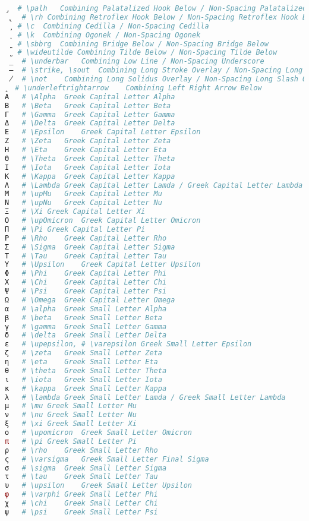 \begin{lstlisting}[language=Julia, linewidth=\textwidth]
 ̡  # \palh   Combining Palatalized Hook Below / Non-Spacing Palatalized Hook Below
 ̢  # \rh Combining Retroflex Hook Below / Non-Spacing Retroflex Hook Below
 ̧  # \c  Combining Cedilla / Non-Spacing Cedilla
 ̨  # \k  Combining Ogonek / Non-Spacing Ogonek
 ̪  # \sbbrg  Combining Bridge Below / Non-Spacing Bridge Below
 ̰  # \wideutilde Combining Tilde Below / Non-Spacing Tilde Below
 ̲  # \underbar   Combining Low Line / Non-Spacing Underscore
 ̶  # \strike, \sout  Combining Long Stroke Overlay / Non-Spacing Long Bar Overlay
 ̸  # \not    Combining Long Solidus Overlay / Non-Spacing Long Slash Overlay
 ͍  # \underleftrightarrow    Combining Left Right Arrow Below
Α   # \Alpha  Greek Capital Letter Alpha
Β   # \Beta   Greek Capital Letter Beta
Γ   # \Gamma  Greek Capital Letter Gamma
Δ   # \Delta  Greek Capital Letter Delta
Ε   # \Epsilon    Greek Capital Letter Epsilon
Ζ   # \Zeta   Greek Capital Letter Zeta
Η   # \Eta    Greek Capital Letter Eta
Θ   # \Theta  Greek Capital Letter Theta
Ι   # \Iota   Greek Capital Letter Iota
Κ   # \Kappa  Greek Capital Letter Kappa
Λ   # \Lambda Greek Capital Letter Lamda / Greek Capital Letter Lambda
Μ   # \upMu   Greek Capital Letter Mu
Ν   # \upNu   Greek Capital Letter Nu
Ξ   # \Xi Greek Capital Letter Xi
Ο   # \upOmicron  Greek Capital Letter Omicron
Π   # \Pi Greek Capital Letter Pi
Ρ   # \Rho    Greek Capital Letter Rho
Σ   # \Sigma  Greek Capital Letter Sigma
Τ   # \Tau    Greek Capital Letter Tau
Υ   # \Upsilon    Greek Capital Letter Upsilon
Φ   # \Phi    Greek Capital Letter Phi
Χ   # \Chi    Greek Capital Letter Chi
Ψ   # \Psi    Greek Capital Letter Psi
Ω   # \Omega  Greek Capital Letter Omega
α   # \alpha  Greek Small Letter Alpha
β   # \beta   Greek Small Letter Beta
γ   # \gamma  Greek Small Letter Gamma
δ   # \delta  Greek Small Letter Delta
ε   # \upepsilon, # \varepsilon Greek Small Letter Epsilon
ζ   # \zeta   Greek Small Letter Zeta
η   # \eta    Greek Small Letter Eta
θ   # \theta  Greek Small Letter Theta
ι   # \iota   Greek Small Letter Iota
κ   # \kappa  Greek Small Letter Kappa
λ   # \lambda Greek Small Letter Lamda / Greek Small Letter Lambda
μ   # \mu Greek Small Letter Mu
ν   # \nu Greek Small Letter Nu
ξ   # \xi Greek Small Letter Xi
ο   # \upomicron  Greek Small Letter Omicron
π   # \pi Greek Small Letter Pi
ρ   # \rho    Greek Small Letter Rho
ς   # \varsigma   Greek Small Letter Final Sigma
σ   # \sigma  Greek Small Letter Sigma
τ   # \tau    Greek Small Letter Tau
υ   # \upsilon    Greek Small Letter Upsilon
φ   # \varphi Greek Small Letter Phi
χ   # \chi    Greek Small Letter Chi
ψ   # \psi    Greek Small Letter Psi

\end{lstlisting}

